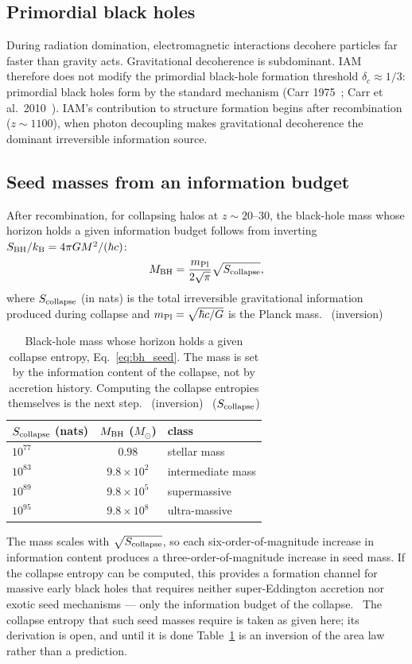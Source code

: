\subsection{Primordial black holes}
During radiation domination, electromagnetic interactions decohere particles far faster than gravity acts. Gravitational decoherence is subdominant. IAM
therefore does not modify the primordial black-hole formation threshold $\delta_c\approx1/3$: primordial black holes form by the standard mechanism (Carr
1975~\cite{Carr1975}; Carr et al.\ 2010~\cite{Carr2010}). IAM's contribution to structure formation begins after recombination ($z\sim1100$), when photon decoupling makes
gravitational decoherence the dominant irreversible information source. \interp

\subsection{Seed masses from an information budget}
After recombination, for collapsing halos at $z\sim20$--30, the black-hole mass whose horizon holds a given information budget follows from inverting
$S_{\rm BH}/k_{\mathrm B}=4\pi GM^2/(\hbar c)$:
\begin{equation}
M_{\rm BH}=\frac{m_{\rm Pl}}{2\sqrt\pi}\sqrt{S_{\rm collapse}},\label{eq:bh_seed}
\end{equation}
where $S_{\rm collapse}$ (in nats) is the total irreversible gravitational information produced during collapse and $m_{\rm Pl}=\sqrt{\hbar c/G}$ is the Planck mass.
\derived\ (inversion)
\begin{table}[htbp]\centering\small
\caption{Black-hole mass whose horizon holds a given collapse entropy, Eq.~\eqref{eq:bh_seed}. The mass is set by the information content of the collapse, not by
accretion history. Computing the collapse entropies themselves is the next step. \calc\ (inversion) \openprob\ ($S_{\rm collapse}$)}\label{tab:bh_seed}
\begin{tabular}{lcl}\toprule
$S_{\rm collapse}$ (nats) & $M_{\rm BH}$ ($M_\odot$) & class\\\midrule
$10^{77}$ & $0.98$ & stellar mass\\
$10^{83}$ & $9.8\times10^{2}$ & intermediate mass\\
$10^{89}$ & $9.8\times10^{5}$ & supermassive\\
$10^{95}$ & $9.8\times10^{8}$ & ultra-massive\\\bottomrule
\end{tabular}
\end{table}
The mass scales with $\sqrt{S_{\rm collapse}}$, so each six-order-of-magnitude increase in information content produces a three-order-of-magnitude increase in seed
mass. If the collapse entropy can be computed, this provides a formation channel for massive early black holes that requires neither super-Eddington
accretion nor exotic seed mechanisms --- only the information budget of the collapse. \conjecture\ The collapse entropy that such seed masses require is taken as given here; its derivation is open, and until it is done Table~\ref{tab:bh_seed} is an inversion of the area law rather than a prediction. \openprob

